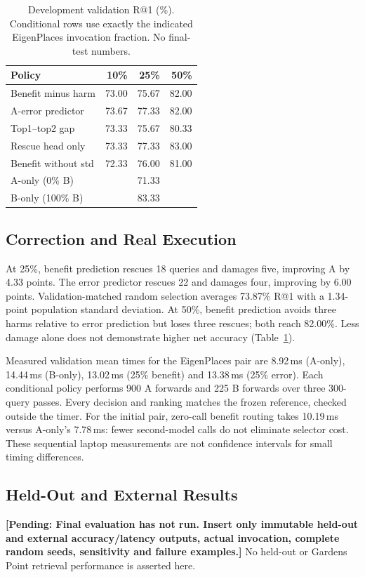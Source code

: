 \documentclass[conference]{IEEEtran}
\newcommand{\pending}[1]{\textbf{[Pending: #1]}}
\begin{document}
\begin{table}[t]
\caption{Development validation R@1 (\%). Conditional rows use exactly the
indicated EigenPlaces invocation fraction. No final-test numbers.}
\label{tab:development}
\centering
\begin{tabular}{lrrr}
\toprule
Policy & 10\% & 25\% & 50\%\\
\midrule
Benefit minus harm &73.00&75.67&82.00\\
A-error predictor &73.67&77.33&82.00\\
Top1--top2 gap &73.33&75.67&80.33\\
Rescue head only &73.33&77.33&83.00\\
Benefit without std &72.33&76.00&81.00\\
\midrule
A-only (0\% B)&\multicolumn{3}{c}{71.33}\\
B-only (100\% B)&\multicolumn{3}{c}{83.33}\\
\bottomrule
\end{tabular}
\end{table}

\subsection{Correction and Real Execution}
At 25\%, benefit prediction rescues 18 queries and damages five, improving
A by 4.33 points. The error predictor rescues 22 and damages four, improving
by 6.00 points. Validation-matched random selection averages 73.87\% R@1
with a 1.34-point population standard deviation. At 50\%, benefit prediction
avoids three harms relative to error prediction but loses three rescues;
both reach 82.00\%. Less damage alone does not demonstrate higher net
accuracy (Table~\ref{tab:development}).

Measured validation mean times for the EigenPlaces pair are 8.92\,ms
(A-only), 14.44\,ms (B-only), 13.02\,ms (25\% benefit) and 13.38\,ms
(25\% error). Each conditional policy performs 900 A forwards and 225 B
forwards over three 300-query passes. Every decision and ranking matches
the frozen reference, checked outside the timer. For the initial pair,
zero-call benefit routing takes 10.19\,ms versus A-only's 7.78\,ms: fewer
second-model calls do not eliminate selector cost. These sequential laptop
measurements are not confidence intervals for small timing differences.

\subsection{Held-Out and External Results}
\pending{Final evaluation has not run. Insert only immutable held-out and
external accuracy/latency outputs, actual invocation, complete random seeds,
sensitivity and failure examples.}
No held-out or Gardens Point retrieval performance is asserted here.
\end{document}
